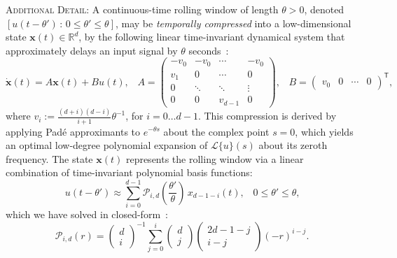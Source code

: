 \documentclass[12pt, a4paper]{article}
\renewcommand{\vec}{\mathbf}  %
\newcommand{\transpose}[1]{{#1}^\mathsf{T}}
\begin{document}
\noindent
\textsc{Additional Detail:} A continuous-time rolling window of length $\theta > 0$, denoted $[ u(t - \theta') \,:\, 0 \le \theta' \le \theta ]$, may be \emph{temporally compressed} into a low-dimensional state $\vec{x}(t) \in \mathbb{R}^d$, by the following linear time-invariant dynamical system that approximately delays an input signal by $\theta$ seconds~\citep{voelkerdelay2017}:
\begin{equation} \label{eq:delay-system}
  \dot{\vec{x}}(t) = A\vec{x}(t) + Bu(t) \text{,} \quad
  A = \begin{pmatrix} -v_0 & -v_0 & \cdots & -v_0 \\ v_1 & 0 & \cdots & 0 \\ 0 & \ddots & \ddots & \vdots \\ 0 & 0 & v_{d-1} & 0\end{pmatrix} \text{,} \quad 
  B = \transpose{\begin{pmatrix} v_0 & 0 & \cdots & 0\end{pmatrix}} \text{,} 
\end{equation}
where $v_i := \frac{(d+i)(d-i)}{i+1} \theta^{-1}$, %
for $i = 0 \ldots d-1$.
This compression is derived by applying Pad\'e approximants to $e^{-\theta s}$ about the complex point $s=0$, which yields an optimal low-degree polynomial expansion of $\mathcal{L}\{u\}(s)$ about its zeroth frequency.
The state $\vec{x}(t)$ represents the rolling window via a linear combination of time-invariant polynomial basis functions:
\begin{equation} \label{eq:basis-interpretation}
\boxed{u(t - \theta') \approx \sum_{i=0}^{d-1} \mathcal{P}_{i,d} \left(\frac{\theta'}{\theta} \right) \, x_{d-1-i}(t) \text{,} \quad 0 \le \theta' \le \theta \text{,}}
\end{equation}
which we have solved in closed-form~\citep[][eq.~14]{voelkerdelay2017}:
\begin{equation} \label{eq:basis-functions}
\mathcal{P}_{i,d}(r) = \begin{pmatrix}d \\ i\end{pmatrix}^{-1} \sum_{j=0}^i \begin{pmatrix}d \\ j\end{pmatrix} \begin{pmatrix}2d - 1 - j \\ i - j\end{pmatrix} \left( -r \right)^{i - j} \text{.} %
\end{equation}
\end{document}
